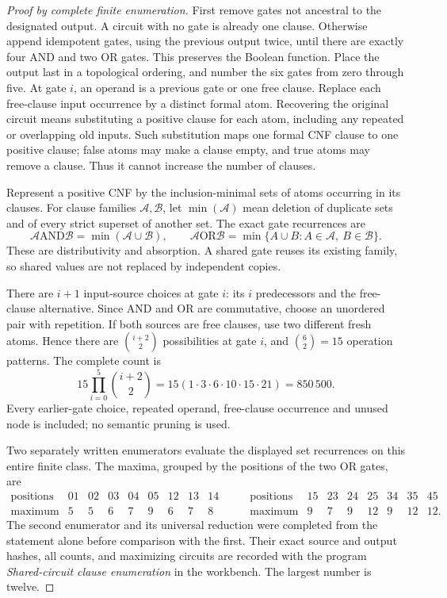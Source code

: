 \begin{proof}[Proof by complete finite enumeration]
First remove gates not ancestral to the designated output. A circuit
with no gate is already one clause. Otherwise append idempotent gates, using the previous output twice, until there are exactly four AND and two OR gates. This preserves the Boolean function. Place the output last in a topological ordering, and number the six gates from zero through five. At gate $i$, an operand is a previous gate or one free clause. Replace each free-clause input occurrence by a distinct formal atom. Recovering the original circuit means substituting a positive clause for each atom, including any repeated or overlapping old inputs. Such substitution maps one formal CNF clause to one positive clause; false atoms may make a clause empty, and true atoms may remove a clause. Thus it cannot increase the number of clauses.

Represent a positive CNF by the inclusion-minimal sets of atoms occurring in its clauses. For clause families $\mathcal A,\mathcal B$, let $\min(\mathcal A)$ mean deletion of duplicate sets and of every strict superset of another set. The exact gate recurrences are
\[
 \mathcal A\mathbin{\mathrm{AND}}\mathcal B
   =\min(\mathcal A\cup\mathcal B),\qquad
 \mathcal A\mathbin{\mathrm{OR}}\mathcal B
   =\min\{A\cup B:A\in\mathcal A,\ B\in\mathcal B\}.
\]
These are distributivity and absorption. A shared gate reuses its existing family, so shared values are not replaced by independent copies.

There are $i+1$ input-source choices at gate $i$: its $i$ predecessors and the free-clause alternative. Since AND and OR are commutative, choose an unordered pair with repetition. If both sources are free clauses, use two different fresh atoms. Hence there are $\binom{i+2}{2}$ possibilities at gate $i$, and $\binom62=15$ operation patterns. The complete count is
\[
 15\prod_{i=0}^5\binom{i+2}{2}
 =15(1\cdot3\cdot6\cdot10\cdot15\cdot21)=850\,500.
\]
Every earlier-gate choice, repeated operand, free-clause occurrence and unused node is included; no semantic pruning is used.

Two separately written enumerators evaluate the displayed set recurrences on this entire finite class. The maxima, grouped by the positions of the two OR gates, are
\[
\begin{array}{c|rrrrrrrr}
\text{positions}&01&02&03&04&05&12&13&14\\\hline
\text{maximum}&5&5&6&7&9&6&7&8
\end{array}
\qquad
\begin{array}{c|rrrrrrr}
\text{positions}&15&23&24&25&34&35&45\\\hline
\text{maximum}&9&7&9&12&9&12&12.
\end{array}
\]
The second enumerator and its universal reduction were completed from the statement alone before comparison with the first. Their exact source and output hashes, all counts, and maximizing circuits are recorded with the program \emph{Shared-circuit clause enumeration} in the workbench. The largest number is twelve.


\end{proof}

